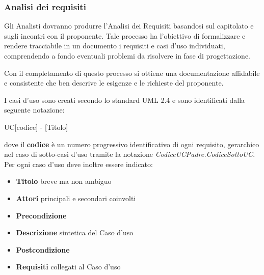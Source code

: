 \documentclass[12pt,a4paper]{article}
\begin{document}
\subsubsection{Analisi dei requisiti} %

Gli Analisti dovranno produrre l'Analisi dei Requisiti basandosi sul capitolato e sugli incontri con il proponente. Tale processo ha l'obiettivo di formalizzare e rendere tracciabile in un documento i requisiti e casi d'uso individuati, comprendendo a fondo eventuali problemi da risolvere in fase di progettazione.

Con il completamento di questo processo si ottiene una documentazione affidabile e consistente che ben descrive le esigenze e le richieste del proponente.

I casi d'uso sono creati secondo lo standard UML 2.4 e sono identificati dalla seguente notazione:
\begin{center}
UC[codice] - [Titolo]
\end{center}
dove il \textbf{codice} è un numero progressivo identificativo di ogni requisito, gerarchico nel  caso di sotto-casi d'uso tramite la notazione \textit{CodiceUCPadre.CodiceSottoUC}. Per ogni caso d'uso deve inoltre essere indicato:
\begin{itemize}
\item \textbf{Titolo} breve ma non ambiguo
\item \textbf{Attori} principali e secondari coinvolti
\item \textbf{Precondizione}
\item \textbf{Descrizione} sintetica del Caso d'uso
\item \textbf{Postcondizione}
\item \textbf{Requisiti} collegati al Caso d'uso
\end{itemize}
\end{document}
